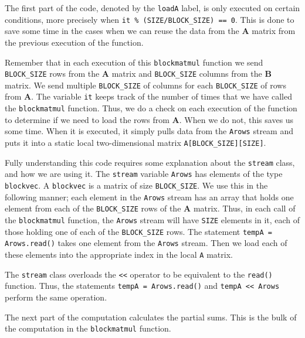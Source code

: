 The first part of the code, denoted by the \lstinline{loadA} label, is only executed on certain conditions, more precisely when \lstinline{it % (SIZE/BLOCK_SIZE) == 0}. This is done to save some time in the cases when we can reuse the data from the $\mathbf{A}$ matrix from the previous execution of the function. 

Remember that in each execution of this \lstinline{blockmatmul} function we send \lstinline{BLOCK_SIZE} rows from the $\mathbf{A}$ matrix and \lstinline{BLOCK_SIZE} columns from the $\mathbf{B}$ matrix. We send multiple \lstinline{BLOCK_SIZE} of columns for each \lstinline{BLOCK_SIZE} of rows from $\mathbf{A}$. The variable \lstinline{it} keeps track of the number of times that we have called the \lstinline{blockmatmul} function. Thus, we do a check on each execution of the function to determine if we need to load the rows from $\mathbf{A}$. When we do not, this saves us some time. When it is executed, it simply pulls data from the \lstinline{Arows} stream and puts it into a static local two-dimensional matrix \lstinline{A[BLOCK_SIZE][SIZE]}. 

Fully understanding this code requires some explanation about the \lstinline{stream} class, and how we are using it. The \lstinline{stream} variable \lstinline{Arows} has elements of the type \lstinline{blockvec}. A \lstinline{blockvec} is a matrix of size \lstinline{BLOCK_SIZE}. We use this in the following manner; each element in the \lstinline{Arows} stream has an array that holds one element from each of the \lstinline{BLOCK_SIZE} rows of the $\mathbf{A}$ matrix. Thus, in each call of the \lstinline{blockmatmul} function, the \lstinline{Arows} stream will have \lstinline{SIZE} elements in it, each of those holding one of each of the \lstinline{BLOCK_SIZE} rows. The statement \lstinline{tempA = Arows.read()} takes one element from the \lstinline{Arows} stream. Then we load each of these elements into the appropriate index in the local \lstinline{A} matrix.

\begin{aside}
The \lstinline{stream} class overloads the \lstinline{<<} operator to be equivalent to the \lstinline{read()} function. Thus, the statements \lstinline{tempA = Arows.read()} and \lstinline{tempA << Arows} perform the same operation.
\end{aside}

The next part of the computation calculates the partial sums. This is the bulk of the computation in the \lstinline{blockmatmul} function. 

